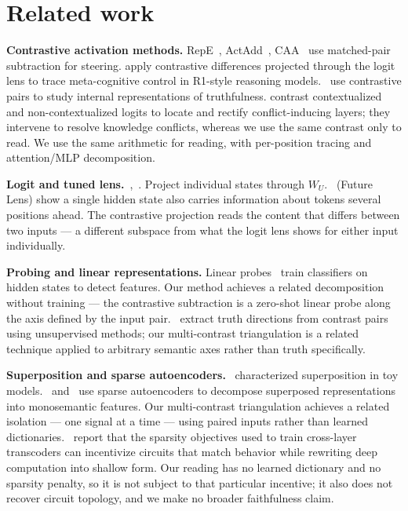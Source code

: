 \documentclass[11pt]{article}
\newcommand{\WU}{W_U}
\begin{document}
\section{Related work}

\textbf{Contrastive activation methods.} RepE~\citep{zou2023}, ActAdd~\citep{turner2023},
CAA~\citep{rimsky2024} use matched-pair subtraction for steering.
\citet{du2026} apply contrastive differences projected through the
logit lens to trace meta-cognitive control in R1-style reasoning
models.~\citet{li2024}
use contrastive pairs to study internal representations of truthfulness.
\citet{ma2026} contrast contextualized and non-contextualized logits to
locate and rectify conflict-inducing layers; they intervene to resolve
knowledge conflicts, whereas we use the same contrast only to read.
We use the same arithmetic for reading, with per-position tracing and
attention/MLP decomposition.

\textbf{Logit and tuned lens.}~\citet{nostalgebraist2020},~\citet{belrose2023}. Project
individual states through $\WU$.~\citet{pal2023} (Future Lens) show a single
hidden state also carries information about tokens several positions ahead.
The contrastive projection reads the content
that differs between two inputs --- a different subspace from what the logit lens
shows for either input individually.

\textbf{Probing and linear representations.} Linear probes~\citep{belinkov2022} train
classifiers on hidden states to detect features. Our method achieves a
related decomposition without training --- the contrastive subtraction is a
zero-shot linear probe along the axis defined by the input pair.~\citet{burns2023}
extract truth directions from contrast pairs using unsupervised
methods; our multi-contrast triangulation is a related technique applied to
arbitrary semantic axes rather than truth specifically.

\textbf{Superposition and sparse autoencoders.}~\citet{elhage2022} characterized
superposition in toy models.~\citet{bricken2023} and~\citet{templeton2024}
use sparse autoencoders to decompose superposed representations into
monosemantic features. Our multi-contrast triangulation achieves a related
isolation --- one signal at a time --- using paired inputs
rather than learned dictionaries.~\citet{lange2026} report that the
sparsity objectives used to train cross-layer transcoders can incentivize
circuits that match behavior while rewriting deep computation into shallow
form. Our reading has no learned dictionary and no sparsity penalty, so it is
not subject to that particular incentive; it also does not recover circuit
topology, and we make no broader faithfulness claim.
\end{document}
